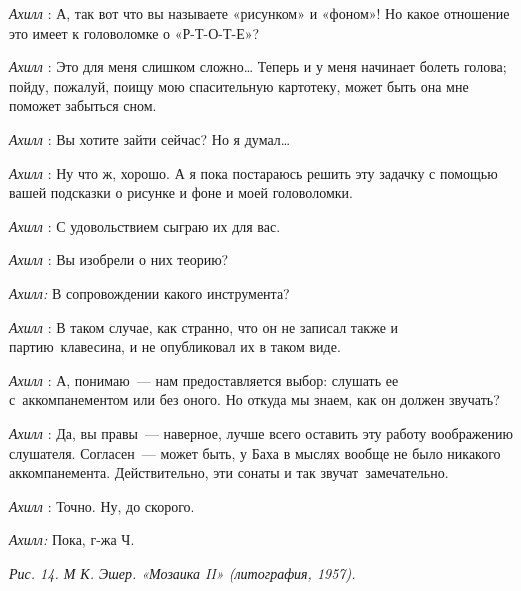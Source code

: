 \emph{Ахилл} : А, так вот что вы называете «рисунком» и «фоном»! Но какое отношение это имеет к головоломке о «Р-Т-О-Т-Е»?

\emph{Ахилл} : Это для меня слишком сложно\ldots{} Теперь и у меня начинает болеть голова; пойду, пожалуй, поищу мою спасительную картотеку, может быть она мне поможет забыться сном.

\emph{Ахилл} : Вы хотите зайти сейчас? Но я думал\ldots{}

\emph{Ахилл} : Ну что ж, хорошо. А я пока постараюсь решить эту задачку с помощью вашей подсказки о рисунке и фоне и моей головоломки.

\emph{Ахилл} : С удовольствием сыграю их для вас.

\emph{Ахилл} : Вы изобрели о них теорию?

\emph{Ахилл:} В сопровождении какого инструмента?

\emph{Ахилл} : В таком случае, как странно, что он не записал также и партию~клавесина, и не опубликовал их в таком виде.

\emph{Ахилл} : А, понимаю~--- нам предоставляется выбор: слушать ее с~аккомпанементом или без оного. Но откуда мы знаем, как он должен звучать?

\emph{Ахилл} : Да, вы правы~--- наверное, лучше всего оставить эту работу воображению слушателя. Согласен~--- может быть, у Баха в мыслях вообще не было никакого аккомпанемента. Действительно, эти сонаты и так звучат~замечательно.

\emph{Ахилл} : Точно. Ну, до скорого.

\emph{Ахилл:} Пока, г-жа Ч.

\emph{Рис. 14. М К. Эшер. «Мозаика II» (литография, 1957).}

